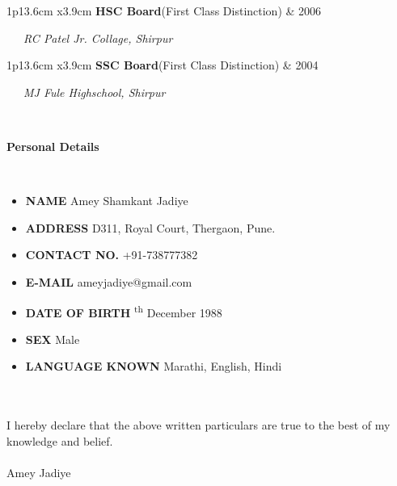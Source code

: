 \documentclass[10pt,A4]{article}
\newcommand{\cvsection}[1]
{
	\begin{center}
		\large\textcolor{sectcol}{\textbf{#1}}
	\end{center}
}
\newcommand{\cvedu}[3]
{

\begin{tabular*}{1\textwidth}{p{13.6cm}  x{3.9cm}}
	\textbf{#2}\tab \small{(First Class Distinction)} & \tab\textcolor{sectcol}{#1} 
\end{tabular*}

	\vspace{-1pt}
	\ \ \ \textcolor{bgcol}{\small{\textit{#3}}}
	\ \ \ \vspace{10pt}

}
\newcommand{\mystrut}{\rule[-.3\baselineskip]{0pt}{\baselineskip}}
\begin{document}

%
\cvedu{2006}{HSC Board}{RC Patel Jr. Collage, Shirpur}


%
\cvedu{2004}{SSC Board}{MJ Fule Highschool, Shirpur}

\ \\

\cvsection{Personal Details}

\ \\
\begin{itemize}

\item \textbf{NAME} \tab Amey Shamkant Jadiye
\item \textbf{ADDRESS} \tab D311, Royal Court, Thergaon, Pune.
\item \textbf{CONTACT NO.} \tab +91-738777382
\item \textbf{E-MAIL} \tab ameyjadiye@gmail.com
\item \textbf{DATE OF BIRTH} \textsuperscript{th} December 1988
\item \textbf{SEX} \tab Male
\item \textbf{LANGUAGE KNOWN} \tab Marathi, English, Hindi

\end{itemize}

\ \\ \\
I hereby declare that the above written particulars are true to the best of my
knowledge and belief.
\\ \\
Amey Jadiye




\null
\vspace*{\fill}
\hspace{-0.25\linewidth}\colorbox{white}{\makebox[1.5\linewidth][c]{\mystrut  \textnormal{\textcolor{sectcol}{www.codeinventory.com} $|$ \textcolor{sectcol}{github.com/ameyjadiye}}}}


%
%
%
%
%
%
\end{document}
